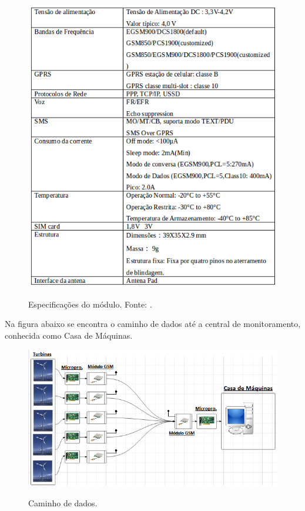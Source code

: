 \begin{figure}[!h]
  \centering
  \includegraphics[scale = 0.6]{editaveis/figuras/modulo_spec}
  \label{modulo_spec}
  \caption[Especificações do módulo]{Especificações do módulo. Fonte: \cite{sendtrue08}.}
\end{figure}

Na figura abaixo se encontra o caminho de dados até a central de monitoramento, conhecida como Casa de Máquinas.

\begin{figure}[!h]
  \centering
  \includegraphics[scale = 0.9]{editaveis/figuras/esquema_transmissao}
  \label{caminho_dados}
  \caption[Caminho de dados]{Caminho de dados.}
\end{figure}

